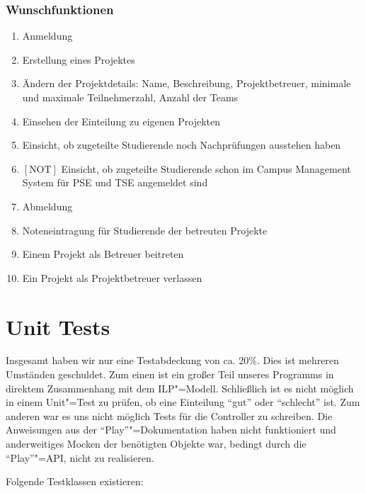 \documentclass[parskip=full]{scrartcl}
\newcommand{\swtLabel}[1]{\textbf{/#1\arabic*0/}}
\begin{document}
\subsubsection{Wunschfunktionen}
\begin{enumerate}[label=\swtLabel{FA}, resume]
  \item Anmeldung
  \item Erstellung eines Projektes
  \item Ändern der Projektdetails: Name, Beschreibung, Projektbetreuer, minimale
und maximale Teilnehmerzahl, Anzahl der Teams
\item Einsehen der Einteilung zu eigenen Projekten
\item Einsicht, ob zugeteilte Studierende noch Nachprüfungen ausstehen haben
\item $[\text{NOT}]$ Einsicht, ob zugeteilte Studierende schon im Campus
Management System für PSE und TSE angemeldet sind
\item Abmeldung
\item Noteneintragung für Studierende der betreuten Projekte
\item Einem Projekt als Betreuer beitreten
\item Ein Projekt als Projektbetreuer verlassen
\end{enumerate}

\section{Unit Tests}

Insgesamt haben wir nur eine Testabdeckung von ca. 20\%. Dies ist mehreren Umständen geschuldet. 
Zum einen ist ein großer Teil unseres Programms in direktem Zusammenhang mit dem ILP"=Modell. Schließlich ist es nicht möglich in einem Unit"=Test zu prüfen, ob eine Einteilung \enquote{gut} oder \enquote{schlecht} ist. 
Zum anderen war es uns nicht möglich Tests für die Controller zu schreiben. Die Anweisungen aus der \enquote{Play}"=Dokumentation haben nicht funktioniert und anderweitiges Mocken der benötigten Objekte war, bedingt durch die \enquote{Play}"=API, nicht zu realisieren.

Folgende Testklassen existieren:
\end{document}
